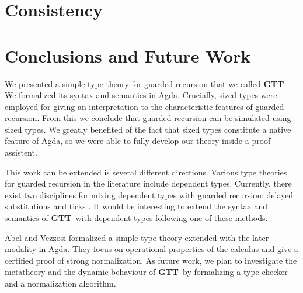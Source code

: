 \documentclass[a4paper,UKenglish,cleveref, autoref,numberwithinsect]{lipics-v2019}
\newcommand{\remove}[1]{}
\newcommand{\GTT}{\textbf{GTT}}
\begin{document}
\section{Consistency}
\label{sec:consistent}


\section{Conclusions and Future Work}
\label{sec:concl}
We presented a simple type theory for guarded recursion that we called \GTT. We
formalized its syntax and semantics in Agda. Crucially, sized types
were employed for giving an interpretation to the characteristic
features of guarded recursion. From this we conclude that guarded
recursion can be simulated using sized types. We greatly benefited
of the fact that sized types constitute a native feature of Agda, so
we were able to fully develop our theory inside a proof assistent. 

This work can be extended is several different directions.
Various type theories for guarded recursion in the literature include
dependent types. Currently, there exist two disciplines for mixing
dependent types with guarded recursion: delayed substitutions
\cite{bizjak2016guarded} and ticks \cite{BahrGM17}. It would be interesting to extend
the syntax and semantics of \GTT\ with dependent types following one
of these methods.

Abel and Vezzosi \cite{AbelV14} formalized a simple type theory
extended with the later modality in Agda. They focus on operational
properties of the calculus and give a certified proof of strong
normalization. As future work, we plan to investigate the metatheory
and the dynamic behaviour of \GTT\ by formalizing a  type
checker and a normalization algorithm.



\remove{
and weakening, and we constructed denotational semantics for it in type theory extended with sized types.
From this, we concluded that this theory is consistent and that guarded recursion can be defined via sized types.

There are several possible ways to improve on this result.
First of all, one could define a dependent version of this type theory extended with multiple clocks.
This can be done in two ways.
Either one extends the object theory with delayed substitutions \cite{bizjak2016guarded} or with ticks \cite{BahrGM17}.
Second of all, with the deep embedding in place, one can further study the meta-theory by defining a formalized type checking and a normalization algorithm.
}
\end{document}

